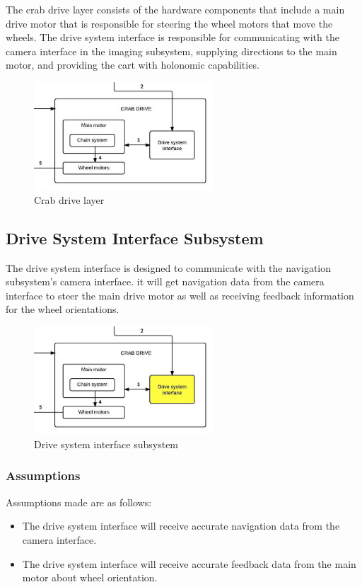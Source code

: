 The crab drive layer consists of the hardware components that include a main drive motor that is responsible for steering the wheel motors that move the wheels. The drive system interface is responsible for communicating with the camera interface in the imaging subsystem, supplying directions to the main motor, and providing the cart with holonomic capabilities.

\begin{figure}[h!]
	\centering
 	\includegraphics[width=0.60\textwidth]{images/crab}
 \caption{Crab drive layer}
\end{figure}

\subsection{Drive System Interface Subsystem}
The drive system interface is designed to communicate with the navigation subsystem's camera interface. it will get  navigation data from the camera interface to steer the main drive motor as well as receiving feedback information for the wheel orientations.

\begin{figure}[h!]
	\centering
 	\includegraphics[width=0.60\textwidth]{images/crab_interface}
 \caption{Drive system interface subsystem}
\end{figure}

\subsubsection{Assumptions}
Assumptions made are as follows:
\begin{itemize}
	\item The drive system interface will receive accurate navigation data from the camera interface.
	\item The drive system interface will receive accurate feedback data from the main motor about wheel orientation.
\end{itemize}

